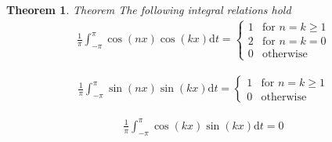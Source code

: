 \documentclass[11pt, oneside]{article}   	%
\newtheorem{theorem}{Theorem}
\begin{document}
\begin{theorem}{Theorem}
The following integral relations hold
\begin{equation}
\begin{split}
 \frac{1}{\pi}\int_{-\pi}^{\pi} \cos(nx)\cos(kx) \mathrm{d}t =  \begin{cases}
  1 & \text{for } n=k \geq 1\\    
  2 & \text{for } n = k = 0\\
  0 & \text{otherwise}  
\end{cases}  \nonumber 
\end{split}
\end{equation}

\begin{equation}
\begin{split}
 \frac{1}{\pi}\int_{-\pi}^{\pi} \sin(nx)\sin(kx) \mathrm{d}t =  \begin{cases}
  1 & \text{for } n=k \geq 1\\    
  0 & \text{otherwise }  
\end{cases}  \nonumber 
\end{split}
\end{equation}

\begin{equation}
\begin{split}
 \frac{1}{\pi}\int_{-\pi}^{\pi} \cos(kx)\sin(kx) \mathrm{d}t = 0
\end{split}
\end{equation}
\end{theorem}
\end{document}

